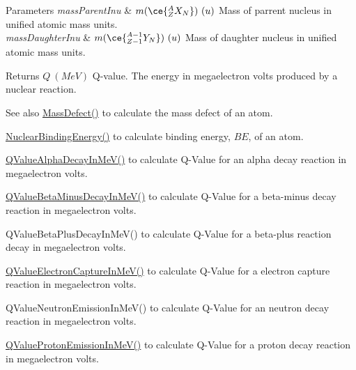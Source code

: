\begin{DoxyParams}{Parameters}
{\em mass\+Parent\+Inu} & $m(\ce{ ^{A}_{Z}X_{N} })\ (u)$ Mass of parrent nucleus in unified atomic mass units. \\
\hline
{\em mass\+Daughter\+Inu} & $m(\ce{ ^{A-1}_{Z-1}Y_{N} })\ (u)$ Mass of daughter nucleus in unified atomic mass units. \\
\hline
\end{DoxyParams}
\begin{DoxyReturn}{Returns}
$Q\ (MeV)$ Q-\/value. The energy in megaelectron volts produced by a nuclear reaction. 
\end{DoxyReturn}
\begin{DoxySeeAlso}{See also}
\mbox{\hyperlink{group___e_g_x_phys-_mass_defect_gae89f2dfa65992c0314adc2440b2f582a}{Mass\+Defect()}} to calculate the mass defect of an atom. 

\mbox{\hyperlink{group___e_g_x_phys-_nuclear_binding_energy_gab6832bf15ead7b4e867e759e0a2a078e}{Nuclear\+Binding\+Energy()}} to calculate binding energy, $BE$, of an atom. 

\mbox{\hyperlink{group___e_g_x_phys-_q_value-_alpha_ga4f9a38d3ad4bf93471a0affb493b6e72}{Q\+Value\+Alpha\+Decay\+In\+Me\+V()}} to calculate Q-\/\+Value for an alpha decay reaction in megaelectron volts. 

\mbox{\hyperlink{group___e_g_x_phys-_q_value-_beta_minus_gaac1374ce9ba39bef416f34298708bda9}{Q\+Value\+Beta\+Minus\+Decay\+In\+Me\+V()}} to calculate Q-\/\+Value for a beta-\/minus decay reaction in megaelectron volts. 

Q\+Value\+Beta\+Plus\+Decay\+In\+Me\+V() to calculate Q-\/\+Value for a beta-\/plus reaction decay in megaelectron volts. 

\mbox{\hyperlink{group___e_g_x_phys-_q_value-_electron_capture_ga9cd8502b6101614c17114e9710cdcf6c}{Q\+Value\+Electron\+Capture\+In\+Me\+V()}} to calculate Q-\/\+Value for a electron capture reaction in megaelectron volts. 

Q\+Value\+Neutron\+Emission\+In\+Me\+V() to calculate Q-\/\+Value for an neutron decay reaction in megaelectron volts. 

\mbox{\hyperlink{group___e_g_x_phys-_q_value-_proton_ga5d92756e945e66bd2ed7d55145b95c3b}{Q\+Value\+Proton\+Emission\+In\+Me\+V()}} to calculate Q-\/\+Value for a proton decay reaction in megaelectron volts. 
\end{DoxySeeAlso}
